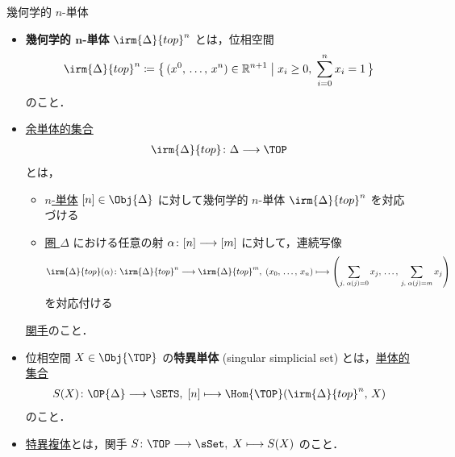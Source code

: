 \documentclass[TQFT_main]{subfiles}
\begin{document}
\begin{mydef}[label=def:simplicial-top,breakable]{幾何学的 $n$-単体}
    \begin{itemize}
        \item \textbf{幾何学的 $\bm{n}$-単体} $\irm{\Delta}{top}^n$ とは，位相空間
        \begin{align}
            \irm{\Delta}{top}^n \coloneqq \bigl\{\, (x^0,\, \dots,\, x^n) \in \mathbb{R}^{n+1}\bigm| x_i \ge 0,\; \sum_{i=0}^n x_i = 1 \,\bigr\} 
        \end{align}
        のこと．
        \item \hyperref[def:SimpSet]{余単体的集合} 
        \begin{align}
            \irm{\Delta}{top} \colon \Delta \lto \TOP
        \end{align}
        とは，
        \begin{itemize}
            \item \hyperref[def:simplex-cat]{$n$-単体} $[n] \in \Obj{\Delta}$ に対して幾何学的 $n$-単体 $\irm{\Delta}{top}^n$ を対応づける
            \item \hyperref[def:simplex-cat]{圏 $\Delta$} における任意の射 $\alpha \colon [n] \longrightarrow [m]$ に対して，連続写像
            \begin{align}
                \irm{\Delta}{top}(\alpha) \colon \irm{\Delta}{top}^n \lto \irm{\Delta}{top}^m,\; (x_0,\, \dots,\, x_n) \lmto \left( \sum_{j,\; \alpha(j) = 0} x_j,\, \dots ,\, \sum_{j,\; \alpha(j) = m} x_j \right) 
            \end{align}
            を対応付ける
        \end{itemize}
        \hyperref[def:functor]{関手}のこと．
        \item 位相空間 $X \in \Obj{\TOP}$ の\textbf{特異単体} (singular simplicial set) とは，\hyperref[def:SimpSet]{単体的集合}
        \begin{align}
            S(X) \colon \OP{\Delta} \lto \SETS,\; [n] \lmto \Hom{\TOP} (\irm{\Delta}{top}^n ,\, X)
        \end{align}
        のこと．
        \item \hyperref[def:simplicial-top]{特異複体}とは，関手 $S \colon \TOP \lto \sSet,\; X \lmto S(X)$ のこと．
    \end{itemize}
    
\end{mydef}
\end{document}
